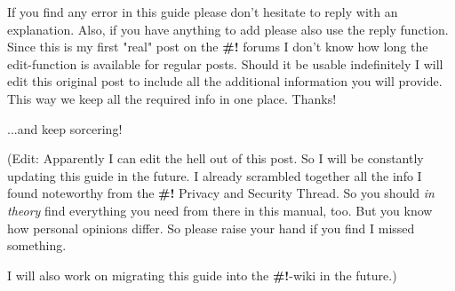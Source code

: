 \documentclass{article}
\begin{document}
 If you find any error in this guide please don't hesitate to reply with an explanation. Also, if you have anything to add please also use the reply function. Since this is my first "real" post on the \textbf{\#!} forums I don't know how long the edit-function is available for regular posts. Should it be usable indefinitely I will edit this original post to include all the additional information you will provide. This way we keep all the required info in one place. Thanks!


 ...and keep sorcering!


 (Edit: Apparently I can edit the hell out of this post. So I will be constantly updating this guide in the future. I already scrambled together all the info I found noteworthy from the \textbf{\#!} Privacy and Security Thread. So you should \emph{in theory} find everything you need from there in this manual, too. But you know how personal opinions differ. So please raise your hand if you find I missed something.


 I will also work on migrating this guide into the \textbf{\#!}-wiki in the future.)
\end{document}
